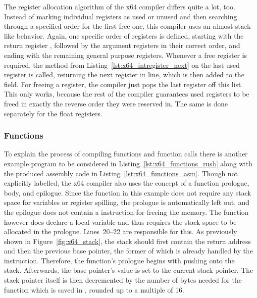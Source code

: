 The register allocation algorithm of the x64 compiler differs quite a lot, too.
Instead of marking individual registers as used or unused and then searching through a specified order for the first free one, this compiler uses an almost stack-like behavior.
Again, one specific order of registers is defined, starting with the return register , followed by the argument registers in their correct order, and ending with the remaining general purpose registers.
Whenever a free register is required, the  method from Listing~\ref{lst:x64_intregister_next} on the last used register is called, returning the next register in line, which is then added to the  field.
For freeing a register, the compiler just pops the last register off this list.
This only works, because the rest of the compiler guarantees used registers to be freed in exactly the reverse order they were reserved in.
The same is done separately for the float registers.


\subsubsection{Functions}


To explain the process of compiling functions and function calls there is another example program to be considered in Listing~\ref{lst:x64_functions_rush} along with the produced assembly code in Listing~\ref{lst:x64_functions_asm}.
Though not explicitly labelled, the x64 compiler also uses the concept of a function prologue, body, and epilogue.
Since the  function in this example does not require any stack space for variables or register spilling, the prologue is automatically left out, and the epilogue does not contain a  instruction for freeing the memory.
The  function however does declare a local variable and thus requires the stack space to be allocated in the prologue.
Lines~20--22 are responsible for this.
As previously shown in Figure~\ref{fig:x64_stack}, the stack should first contain the return address and then the previous base pointer, the former of which is already handled by the  instruction.
Therefore, the function's prologue begins with pushing  onto the stack.
Afterwards, the base pointer's value is set to the current stack pointer.
The stack pointer itself is then decremented by the number of bytes needed for the function which is saved in , rounded up to a multiple of 16.


